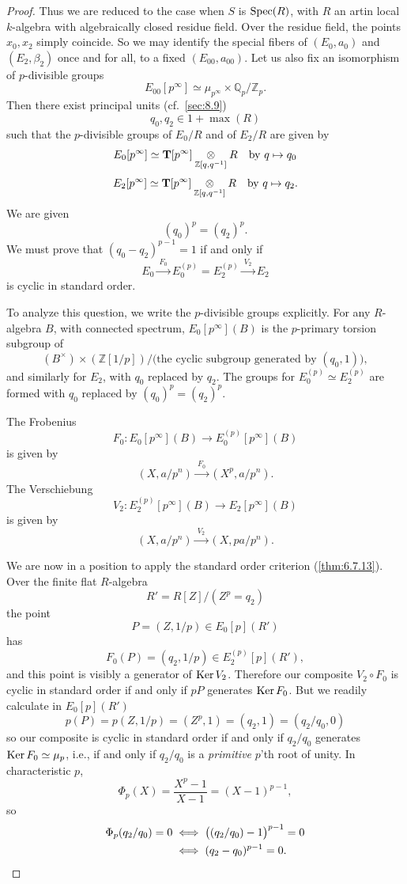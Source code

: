 \begin{proof}
Thus we are reduced to the case when $S$ is $\operatorname{Spec}(R)$, with $R$ an artin local $k$-algebra with algebraically closed residue field. Over the residue field, the points $x_0, x_2$ simply coincide. So we may identify the special fibers of $(E_0, a_0)$ and $(E_2, \beta_2)$ once and for all, to a fixed $(E_{00}, a_{00})$. Let us also fix an isomorphism of $p$-divisible groups
\[
E_{00}[p^\infty] \simeq \mu_{p^\infty} \times \mathbb{Q}_p/\mathbb{Z}_p .
\]
Then there exist principal units (cf.~\ref{sec:8.9})
\[
q_0, q_2 \in 1 + \max(R)
\]
such that the $p$-divisible groups of $E_0/R$ and of $E_2/R$ are given by
\[
E_0[p^\infty] \simeq \mathbf{T}[p^\infty] \underset{\mathbb{Z}[q, q^{-1}]}{\otimes} R \quad\text{by } q \mapsto q_0
\]
\[
E_2[p^\infty] \simeq \mathbf{T}[p^\infty] \underset{\mathbb{Z}[q, q^{-1}]}{\otimes} R \quad\text{by } q \mapsto q_2 .
\]
We are given
\[
(q_0)^p = (q_2)^p .
\]
We must prove that $(q_0 - q_2)^{p-1} = 1$ if and only if
\[
E_0 \xrightarrow{\ F_0\ } E_0^{(p)} = E_2^{(p)} \xrightarrow{\ V_2\ } E_2
\]
is cyclic in standard order.

To analyze this question, we write the $p$-divisible groups explicitly. For any $R$-algebra $B$, with connected spectrum, $E_0[p^\infty](B)$ is the $p$-primary torsion subgroup of
\[
(B^\times) \times (\mathbb{Z}[1/p]) \big/ \bigl( \text{the cyclic subgroup generated by } (q_0, 1) \bigr) ,
\]
and similarly for $E_2$, with $q_0$ replaced by $q_2$. The groups for $E_0^{(p)} \simeq E_2^{(p)}$ are formed with $q_0$ replaced by $(q_0)^p = (q_2)^p$.

The Frobenius
\[
F_0 : E_0[p^\infty](B) \to E_0^{(p)}[p^\infty](B)
\]
is given by
\[
(X, a/p^n) \xrightarrow{\ F_0\ } (X^p, a/p^n) .
\]
The Verschiebung
\[
V_2 : E_2^{(p)}[p^\infty](B) \to E_2[p^\infty](B)
\]
is given by
\[
(X, a/p^n) \xrightarrow{\ V_2\ } (X, pa/p^n) .
\]

We are now in a position to apply the standard order criterion (\ref{thm:6.7.13}). Over the finite flat $R$-algebra
\[
R' = R[Z]/(Z^p = q_2)
\]
the point
\[
P = (Z, 1/p) \in E_0[p](R')
\]
has
\[
F_0(P) = (q_2, 1/p) \in E_2^{(p)}[p](R') ,
\]
and this point is visibly a generator of $\operatorname{Ker} V_2$. Therefore our composite $V_2 \circ F_0$ is cyclic in standard order if and only if $pP$ generates $\operatorname{Ker} F_0$. But we readily calculate in $E_0[p](R')$
\[
p(P) = p(Z, 1/p) = (Z^p, 1) = (q_2, 1) = (q_2/q_0, 0)
\]
so our composite is cyclic in standard order if and only if $q_2/q_0$ generates $\operatorname{Ker} F_0 \simeq \mu_p$, i.e., if and only if $q_2/q_0$ is a \emph{primitive} $p$'th root of unity. In characteristic $p$,
\[
\Phi_p(X) = \frac{X^p - 1}{X - 1} = (X-1)^{p-1} ,
\]
so
\begin{align*}
\Phi_p(q_2/q_0) = 0 &\iff \bigl( (q_2/q_0) - 1 \bigr)^{p-1} = 0 \\
&\iff (q_2 - q_0)^{p-1} = 0 . \qedhere
\end{align*}
\end{proof}


